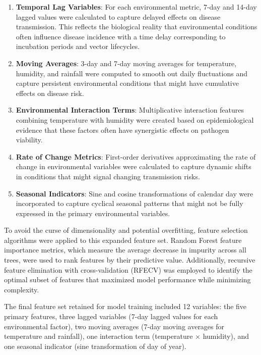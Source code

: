 \documentclass[12pt,a4paper]{report}
\begin{document}
\begin{enumerate}
    \item \textbf{Temporal Lag Variables}: For each environmental metric, 7-day and 14-day lagged values were calculated to capture delayed effects on disease transmission. This reflects the biological reality that environmental conditions often influence disease incidence with a time delay corresponding to incubation periods and vector lifecycles.
    
    \item \textbf{Moving Averages}: 3-day and 7-day moving averages for temperature, humidity, and rainfall were computed to smooth out daily fluctuations and capture persistent environmental conditions that might have cumulative effects on disease risk.
    
    \item \textbf{Environmental Interaction Terms}: Multiplicative interaction features combining temperature with humidity were created based on epidemiological evidence that these factors often have synergistic effects on pathogen viability.
    
    \item \textbf{Rate of Change Metrics}: First-order derivatives approximating the rate of change in environmental variables were calculated to capture dynamic shifts in conditions that might signal changing transmission risks.
    
    \item \textbf{Seasonal Indicators}: Sine and cosine transformations of calendar day were incorporated to capture cyclical seasonal patterns that might not be fully expressed in the primary environmental variables.
\end{enumerate}

To avoid the curse of dimensionality and potential overfitting, feature selection algorithms were applied to this expanded feature set. Random Forest feature importance metrics, which measure the average decrease in impurity across all trees, were used to rank features by their predictive value. Additionally, recursive feature elimination with cross-validation (RFECV) was employed to identify the optimal subset of features that maximized model performance while minimizing complexity.

The final feature set retained for model training included 12 variables: the five primary features, three lagged variables (7-day lagged values for each environmental factor), two moving averages (7-day moving averages for temperature and rainfall), one interaction term (temperature × humidity), and one seasonal indicator (sine transformation of day of year).
\end{document}
